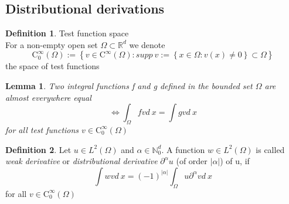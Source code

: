 \documentclass[english]{article}
\newtheorem*{lemma}{Lemma}
\theoremstyle{definition}
\newtheorem*{defi}{Definition}
\theoremstyle{remark}
\newcommand{\p}{\partial}
\newcommand{\NN}{\mathbb{N}}			%
\newcommand{\RR}{\mathbb{R}}			%
\renewcommand{\aa}{\alpha}		%
\newcommand{\OO}{\Omega}
\newcommand{\cinf}{\tx{C}^\infty}
\newcommand{\gdw}{\Leftrightarrow}	%
\newcommand{\tx}[1]{\text{#1}}
\begin{document}
\subsection{Distributional derivations}
\begin{defi} Test function space\\
  For a non-empty open set $\OO \subset \RR^d$ we denote 
  $$\cinf_0 (\OO) := \left\{v \in \cinf(\OO) : supp\ v := \left\{x \in \OO: v(x)\neq 0 \right\} \subset \OO\right\}$$
  the space of test functions
\end{defi}
\begin{lemma}
  Two integral functions f and g defined in the bounded set $\OO$ are almost everywhere equal 
  $$\gdw \int_\OO f v d\ x = \int g v d\ x$$
  for all test functions $v \in \cinf_0(\OO	)$
\end{lemma}
\begin{defi}
  Let $u \in L^2(\OO)$ and $\aa \in \NN^d _0$. A function $w \in L^2(\OO)$ is called \emph{weak derivative}  or \emph{distributional derivative}  $\p^\aa u$ (of order $|\aa|$) of u, if 
  $$\int w v d\ x = (-1)^{|\aa|} \int _\OO u \p^\aa v d\ x$$
  for all $v \in \cinf_0(\OO)$

\end{defi}
\end{document}
